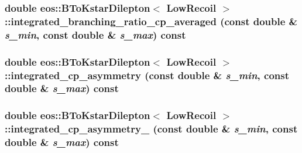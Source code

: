 \label{classeos_1_1BToKstarDilepton_3_01LowRecoil_01_4_a58edd7101a9cb8aceb1f1ccfdd902b6b}
\hypertarget{classeos_1_1BToKstarDilepton_3_01LowRecoil_01_4_aa036cffb6a06b8b4a39dffebb2c6cb16}{
\subsubsection[{integrated\_\-branching\_\-ratio\_\-cp\_\-averaged}]{\setlength{\rightskip}{0pt plus 5cm}double eos::BToKstarDilepton$<$ {\bf LowRecoil} $>$::integrated\_\-branching\_\-ratio\_\-cp\_\-averaged (const double \& {\em s\_\-min}, \/  const double \& {\em s\_\-max}) const}}
\label{classeos_1_1BToKstarDilepton_3_01LowRecoil_01_4_aa036cffb6a06b8b4a39dffebb2c6cb16}
\hypertarget{classeos_1_1BToKstarDilepton_3_01LowRecoil_01_4_aca800290e1d89caca0f03adc7b77f476}{
\subsubsection[{integrated\_\-cp\_\-asymmetry}]{\setlength{\rightskip}{0pt plus 5cm}double eos::BToKstarDilepton$<$ {\bf LowRecoil} $>$::integrated\_\-cp\_\-asymmetry (const double \& {\em s\_\-min}, \/  const double \& {\em s\_\-max}) const}}
\label{classeos_1_1BToKstarDilepton_3_01LowRecoil_01_4_aca800290e1d89caca0f03adc7b77f476}
\hypertarget{classeos_1_1BToKstarDilepton_3_01LowRecoil_01_4_a087f366b330084ec2b2476aee279ba18}{
\subsubsection[{integrated\_\-cp\_\-asymmetry\_\-1}]{\setlength{\rightskip}{0pt plus 5cm}double eos::BToKstarDilepton$<$ {\bf LowRecoil} $>$::integrated\_\-cp\_\-asymmetry\_ (const double \& {\em s\_\-min}, \/  const double \& {\em s\_\-max}) const}}

